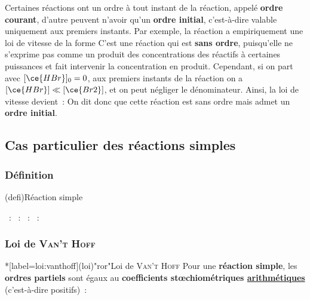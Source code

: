 \documentclass[../../main/main.tex]{subfiles}
\begin{document}
Certaines réactions ont un ordre à tout instant de la réaction, appelé
\textbf{ordre courant}, d'autre peuvent n'avoir qu'un \textbf{ordre initial},
c'est-à-dire valable uniquement aux premiers instants. Par exemple, la réaction
\psw{
	\[\ce{Br2\gaz{} + H2\gaz{} = 2HBr\gaz{}}\]
}
a empiriquement une loi de vitesse de la forme
\psw{
	\[
		v = \frac{k[\ce{H2}]\times[\ce{Br2}]^{1/2}}
		{1+k' \frac{[\ce{HBr}]}{[\ce{Br2}]}}
	\]
}
\noindent
C'est une réaction qui est \textbf{sans ordre}, puisqu'elle ne s'exprime pas
comme un produit des concentrations des réactifs à certaines puissances et fait
intervenir la concentration en produit.
\smallbreak
Cependant, si on part avec $[\ce{HBr}]_0 =
	0$, aux premiers instants de la réaction on a $[\ce{HBr}] \ll [\ce{Br2}]$, et on
peut négliger le dénominateur. Ainsi, la loi de vitesse devient~:
\psw{
	\[v \Sim_{t\to 0} k [\ce{H2}][\ce{Br2}]^{1/2}\]
}
On dit donc que cette réaction est sans ordre mais admet un \textbf{ordre initial}.

\subsection{Cas particulier des réactions simples}
\subsubsection{Définition}
\begin{tcb}[label=def:reacsimple](defi){Réaction simple}
	\begin{itemize}
		~:
		~:
		~:
		~:
	\end{itemize}
\end{tcb}

\subsubsection{Loi de \textsc{Van't Hoff}}
\begin{tcb}*[label=loi:vanthoff](loi)"ror"{Loi de \textsc{Van't Hoff}}
	Pour une \textbf{réaction simple}, les \textbf{ordres partiels} sont égaux
	au \textbf{coefficients stœchiométriques \underline{arithmétiques}}
	(c'est-à-dire positifs)~:
	\psw{
	\[
		\boxed{v = k[{\ce{A}}]^{\left| \nu_{\ce{A}} \right|}
				[{\ce{B}}]^{\left| \nu_{\ce{B}} \right|}}
		\Longleftrightarrow
		\boxed{v = k\prod_{i=1}^{p}[{\ce{R}}_i]^{\left| \nu_i \right|}}
	\]
	}
\end{tcb}
\end{document}
